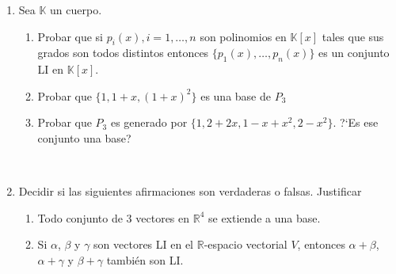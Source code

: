 \documentclass[11pt,spanish,makeidx]{amsbook}
\newcommand\R{\mathbb{R}}
\begin{document}
\begin{enumerate}
	\
		
	\item Sea $\mathbb{K}$ un cuerpo.
	\begin{enumerate}
		\item Probar que si $p_i(x), i = 1, \ldots , n$ son polinomios en $\mathbb{K}[x]$ tales que sus grados son todos distintos entonces $\{p_1(x), \ldots ,p_n(x)\}$ es un conjunto LI en $\mathbb{K}[x]$.
		\item Probar que $\{1 ,1 + x, (1 +x)^2\}$ es una base de $P_3$
		\item Probar que $P_3$ es generado por $\{1, 2 + 2x, 1 - x + x^2, 2 - x^2\}$.
		?`Es ese conjunto una base?
	\end{enumerate}
	
	\	
	
	\item Decidir si las siguientes afirmaciones son verdaderas o falsas. Justificar
	\begin{enumerate}
		\item Todo conjunto de $3$ vectores en $\R^4$ se extiende a una base.
\item  Si $\alpha$, $\beta$ y $\gamma$ son vectores LI en el $\R$-espacio vectorial $V$, entonces $\alpha +\beta$, $\alpha +\gamma$ y $\beta +\gamma $ tambi\'en son LI.
	\end{enumerate}
	
	
	
	
	
	
	
	
\end{enumerate}
\end{document}
